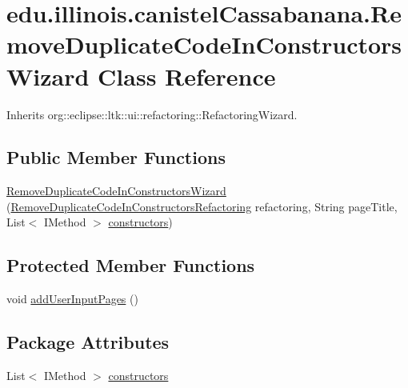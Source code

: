 \hypertarget{classedu_1_1illinois_1_1canistelCassabanana_1_1RemoveDuplicateCodeInConstructorsWizard}{
\section{edu.illinois.canistelCassabanana.RemoveDuplicateCodeInConstructorsWizard Class Reference}
\label{classedu_1_1illinois_1_1canistelCassabanana_1_1RemoveDuplicateCodeInConstructorsWizard}
}


Inherits org::eclipse::ltk::ui::refactoring::RefactoringWizard.

\subsection*{Public Member Functions}
\begin{DoxyCompactItemize}
\item 
\hyperlink{classedu_1_1illinois_1_1canistelCassabanana_1_1RemoveDuplicateCodeInConstructorsWizard_ab1463612b9cc45e77d2c7dc115890441}{RemoveDuplicateCodeInConstructorsWizard} (\hyperlink{classedu_1_1illinois_1_1canistelCassabanana_1_1RemoveDuplicateCodeInConstructorsRefactoring}{RemoveDuplicateCodeInConstructorsRefactoring} refactoring, String pageTitle, List$<$ IMethod $>$ \hyperlink{classedu_1_1illinois_1_1canistelCassabanana_1_1RemoveDuplicateCodeInConstructorsWizard_a453b25c19248760218a9aa07e0c7f8f2}{constructors})
\end{DoxyCompactItemize}
\subsection*{Protected Member Functions}
\begin{DoxyCompactItemize}
\item 
void \hyperlink{classedu_1_1illinois_1_1canistelCassabanana_1_1RemoveDuplicateCodeInConstructorsWizard_a90db10f5ddce610c821601b1f82cd830}{addUserInputPages} ()
\end{DoxyCompactItemize}
\subsection*{Package Attributes}
\begin{DoxyCompactItemize}
\item 
List$<$ IMethod $>$ \hyperlink{classedu_1_1illinois_1_1canistelCassabanana_1_1RemoveDuplicateCodeInConstructorsWizard_a453b25c19248760218a9aa07e0c7f8f2}{constructors}
\end{DoxyCompactItemize}


